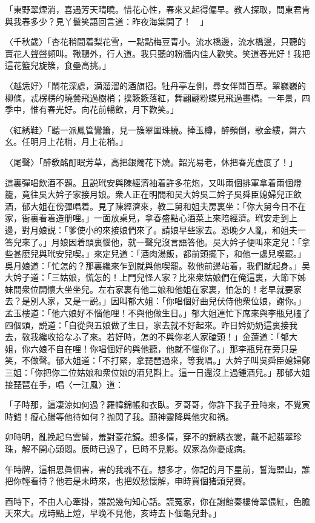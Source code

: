 \begin{myquote}
「東野翠煙消，喜遇芳天晴曉。惜花心性，春來又起得偏早。教人探取，問東君肯與我春多少？見丫鬟笑語回言道：昨夜海棠開了！　」

{\markfont〈千秋歲〉}「杏花稍間着梨花雪，一點點梅豆青小。流水橋邊，流水橋邊，只聽的賣花人聲聲頻叫。鞦韆外，行人道。我只聽的粉牆内佳人歡笑。笑道春光好！我把這花籃兒旋簇，食壘高挑。」

{\markfont〈越恁好〉}「鬧花深處，滴溜溜的酒旗招。牡丹亭左側，尋女伴鬦百草。翠巍巍的柳條，忒楞楞的曉鶯飛過樹梢；撲簌簌落紅，舞翩翩粉蝶兒飛過畫橋。一年景，四季中，惟有春光好。向花前暢飲，月下歡笑。」

{\markfont〈紅綉鞋〉}「聽一派鳳管鸞簫，見一簇翠圍珠繞。捧玉樽，醉頻倒，歌金縷，舞六幺。任明月上花梢，月上花梢。」

{\markfont〈尾聲〉}「醉敎酩酊眠芳草，高把銀燭花下燒。韶光易老，休把春光虚度了！」
\end{myquote}

這裏彈唱飲酒不題。且説玳安與陳經濟袖着許多花炮，又叫兩個排軍拿着兩個燈籠，竟往吳大妗子家接月娘。衆人正在明間和吴大妗吳二妗子吳舜臣媳婦兒正飲酒，郁大姐在傍彈唱着。見了陳經濟來，教二舅和姐夫房裏坐：「你大舅今日不在家，衙裏看着造册哩。」一面放桌兒，拿春盛點心酒菜上來陪經濟。玳安走到上邊，對月娘説：「爹使小的來接娘們來了。請娘早些家去。恐晚夕人亂，和姐夫一答兒來了。」月娘因着頭裏惱他，就一聲兒沒言語答他。吳大妗子便叫來定兒：「拿些甚麽兒與玳安兒喫。」來定兒道：「酒肉湯飯，都前頭擺下，和他一處兒喫罷。」吳月娘道：「忙怎的？那裏纔來乍到就與他喫罷。敎他前邊站着，我們就起身。」吴大妗子道：「三姑娘，慌怎的！上門兒怪人家？比來衆姑娘們在俺這裏，大節下姊妹間衆位開懷大坐坐兒。左右家裏有他二娘和他姐在家裏，怕怎的！老早就要家去？是別人家，又是一説。」因叫郁大姐：「你唱個好曲兒伏侍他衆位娘，謝你。」孟玉樓道：「他六娘好不惱他哩！不與他做生日。」郁大姐連忙下席來與李瓶兒磕了四個頭，説道：「自從與五娘做了生日，家去就不好起來。昨日妗奶奶這裏接我去，敎我纔收拾なふ了來。若好時，怎的不與你老人家磕頭！」金蓮道：「郁大姐，你六娘不自在哩！你唱個好的與他聽，他就不惱你了。」那李瓶兒在旁只是笑，不做聲。郁大姐道：「不打緊，拿琵琶過來，等我唱。」大妗子叫吳舜臣媳婦鄭三姐：「你把你二位姑娘和衆位娘的酒兒斟上。這一日還沒上過鍾酒兒。」那郁大姐接琵琶在手，唱〈一江風〉道：

\begin{myquote}
「子時那，這凄涼如何過？羅幃錦帳和衣臥。歹哥哥，你許下我子丑時來，不覺寅時錯！癡心腸等他待如何？抛閃了我。願神靈降與他灾和祸。

卯時明，亂挽起乌雲髻，羞對菱花鏡。想多情，穿不的錦綉衣裳，戴不起翡翠珍珠，解不開心頭悶。辰時已過了，巳時不見影。奴家為你憂成病。

午時牌，這相思眞個害，害的我魂不在。想多才，你記的月下星前，誓海盟山，誰把你輕看待？他若是未時來，也把奴愁懷解，申時買個猪頭兒賽。

酉時下，不由人心牽掛，誰説幾句知心話。謊冤家，你在謝館秦樓倚翠偎紅，色膽天來大。戌時點上燈，早晚不見他，亥時去卜個龜兒卦。」
\end{myquote}

